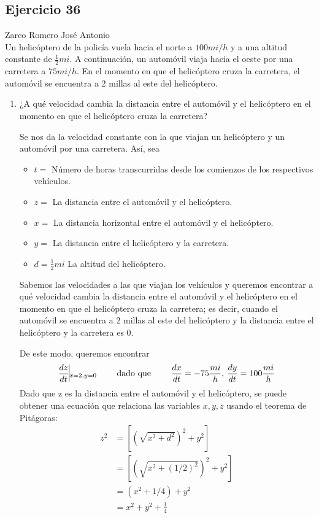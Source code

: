\documentclass[12pt]{article}
\begin{document}
\subsection{Ejercicio 36} Zarco Romero José Antonio \\

Un helicóptero de la policía vuela hacia el norte a $100 mi/h$ y a una altitud constante de $\frac{1}{2} mi$. A continuación, un automóvil viaja hacia el oeste por una carretera a $75 mi/h$. En el momento en que el helicóptero cruza la carretera, el automóvil se encuentra a 2 millas al este del helicóptero.
\begin{enumerate}
\item ¿A qué velocidad cambia la distancia entre el automóvil y el helicóptero en el momento en que el helicóptero cruza la carretera?

Se nos da la velocidad constante con la que viajan un helicóptero y un automóvil por una carretera. Así, sea
\begin{itemize}
\item $t=$ Número de horas transcurridas desde los comienzos de los respectivos vehículos.
\item $z=$ La distancia entre el automóvil y el helicóptero.
\item $x=$ La distancia horizontal entre el automóvil y el helicóptero.
\item $y=$ La distancia entre el helicóptero y la carretera.
\item $d=\frac{1}{2} mi$ La altitud del helicóptero.
\end{itemize}
Sabemos las velocidades a las que viajan los vehículos y queremos encontrar a qué velocidad cambia la distancia entre el automóvil y el helicóptero en el momento en que el helicóptero cruza la carretera; es decir, cuando el automóvil se encuentra a 2 millas al este del helicóptero y la distancia entre el helicóptero y la carretera es 0. 

De este modo, queremos encontrar
\begin{align*}
  \frac{dz}{dt}\vline_{x=2, y=0} \qquad \text{ dado que } \qquad \frac{dx}{dt}=-75\frac{mi}{h} \text{, } \frac{dy}{dt}=100\frac{mi}{h}
\end{align*}
Dado que z es la distancia entre el automóvil y el helicóptero, se puede obtener una ecuación que relaciona las variables $x,y,z$ usando el teorema de Pitágoras:
\begin{equation*}
  \begin{split}
    z^2
    &=[(\sqrt{x^2+d^2})^2+y^2] \\
    &=[(\sqrt{x^2+(1/2)^2})^2+y^2] \\
    &=(x^2+1/4)+y^2 \\
    &=x^2+y^2+\frac{1}{4} \\
  \end{split}
\end{equation*}


\end{enumerate}
\end{document}
